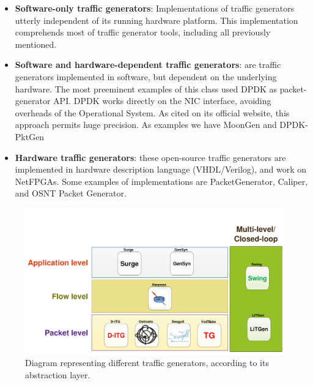 \begin{itemize}

\item \textbf{Software-only traffic generators}: Implementations of traffic generators utterly independent of its running hardware platform. This implementation comprehends most of traffic generator tools, including all previously mentioned. 

\item \textbf{Software and hardware-dependent traffic generators}: are traffic generators implemented in software, but dependent on the underlying hardware. The most preeminent examples of this class used DPDK\cite{web-dpdk} as packet-generator API. DPDK works directly on the \acrfull{NIC} interface, avoiding overheads of the Operational System. As cited on its official website, this approach permits huge precision. As examples we have MoonGen\cite{moongen-paper} and DPDK-PktGen\cite{web-dpdk-pktgen}

\item \textbf{Hardware traffic generators}: these open-source traffic generators are implemented in hardware description language (VHDL/Verilog), and work on NetFPGAs. Some examples of implementations are PacketGenerator\cite{pktgen-netfpga-paper}, Caliper\cite{caliper-paper}, and OSNT Packet Generator\cite{osnt-paper}.

\end{itemize}


\begin{figure}[!ht]
	\centering
	\includegraphics[scale=0.4]{figures/ch2/types-workload-tools}
	\caption{Diagram representing different traffic generators, according to its abstraction layer.}
	\label{fig:layers-workload-tools}
\end{figure}






